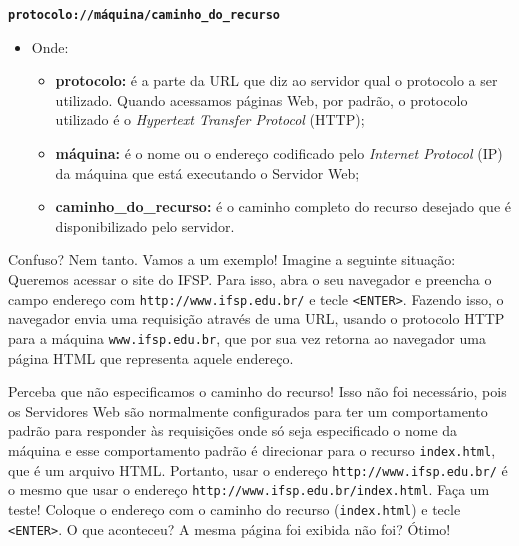 \begin{center}
    \textbf{\texttt{protocolo://máquina/caminho\_do\_recurso}}
\end{center}

\begin{itemize}
    
    \item Onde:
    
    \begin{itemize}
    
        \item \textbf{protocolo:} é a parte da URL que diz ao servidor qual o protocolo a ser utilizado. Quando acessamos páginas Web, por padrão, o protocolo utilizado é o \textit{Hypertext Transfer Protocol} (HTTP);
        
        \item \textbf{máquina:} é o nome ou o endereço codificado pelo \textit{Internet Protocol} (IP) da máquina que está executando o Servidor Web;
        
        \item \textbf{caminho\_do\_recurso:} é o caminho completo do recurso desejado que é disponibilizado pelo servidor.
        
    \end{itemize}
    
\end{itemize}

Confuso? Nem tanto. Vamos a um exemplo! Imagine a seguinte situação: Queremos acessar o site do IFSP. Para isso, abra o seu navegador e preencha o campo endereço com \texttt{http://www.ifsp.edu.br/} e tecle \texttt{<ENTER>}. Fazendo isso, o navegador envia uma requisição através de uma URL, usando o protocolo HTTP para a máquina \texttt{www.ifsp.edu.br}, que por sua vez retorna ao navegador uma página HTML que representa aquele endereço. 

Perceba que não especificamos o caminho do recurso! Isso não foi necessário, pois os Servidores Web são normalmente configurados para ter um comportamento padrão para responder às requisições onde só seja especificado o nome da máquina e esse comportamento padrão é direcionar para o recurso \texttt{index.html}, que é um arquivo HTML. Portanto, usar o endereço \texttt{http://www.ifsp.edu.br/} é o mesmo que usar o endereço \texttt{http://www.ifsp.edu.br/index.html}. Faça um teste! Coloque o endereço com o caminho do recurso (\texttt{index.html}) e tecle \texttt{<ENTER>}. O que aconteceu? A mesma página foi exibida não foi? Ótimo!

